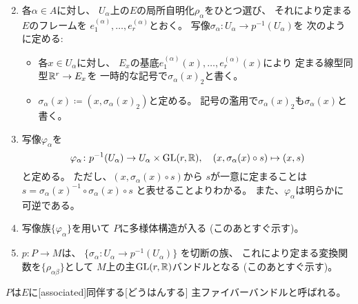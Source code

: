 \documentclass[report]{jlreq}
\begin{document}
\begin{definition}[フレームバンドル]
\begin{enumerate}
\begin{equation}
            \end{equation}
        \item 各$\alpha \in A$に対し、
            $U_\alpha$上の$E$の局所自明化$\rho_\alpha$をひとつ選び、
            それにより定まる$E$のフレームを
            $e_1^{(\alpha)}, \dots, e_r^{(\alpha)}$とおく。
            写像$\sigma_\alpha \colon U_\alpha \to p^{-1}(U_\alpha)$を
            次のように定める:
            \begin{itemize}
                \item 各$x \in U_\alpha$に対し、
                    $E_x$の基底$e_1^{(\alpha)}(x), \dots, e_r^{(\alpha)}(x)$により
                    定まる線型同型$\mathbb{R}^r \to E_x$を
                    一時的な記号で$\sigma_\alpha(x)_2$と書く。
                \item $\sigma_\alpha(x) \coloneqq (x, \sigma_\alpha(x)_2)$と定める。
                    記号の濫用で$\sigma_\alpha(x)_2$も$\sigma_\alpha(x)$と書く。
            \end{itemize}
        \item 写像$\varphi_\alpha$を
            \begin{equation}
                \varphi_\alpha
                    \colon p^{-1}(U_\alpha) \to U_\alpha \times \operatorname{\mathrm{GL}}(r, \mathbb{R}),
                    \quad
                    (x, \sigma_\alpha(x) \circ s) \mapsto (x, s)
            \end{equation}
            と定める。
            ただし、$(x, \sigma_\alpha(x) \circ s)$から
            $s$が一意に定まることは
            $s = \sigma_\alpha(x)^{-1} \circ \sigma_\alpha(x) \circ s$
            と表せることよりわかる。
            また、$\varphi_\alpha$は明らかに可逆である。
        \item 写像族$\{ \varphi_\alpha \}$を用いて
            $P$に多様体構造が入る (このあとすぐ示す)。
        \item $p \colon P \to M$は、
            $\{ \sigma_\alpha \colon U_\alpha \to p^{-1}(U_\alpha) \}$
            を切断の族、
            これにより定まる変換関数を$\{ \rho_{\alpha\beta} \}$として
            $M$上の主$\operatorname{\mathrm{GL}}(r, \mathbb{R})$バンドルとなる (このあとすぐ示す)。
    \end{enumerate}
    $P$は$E$に[associated]{同伴する}[どうはんする]
    主ファイバーバンドルと呼ばれる。
\end{definition}
\end{document}
